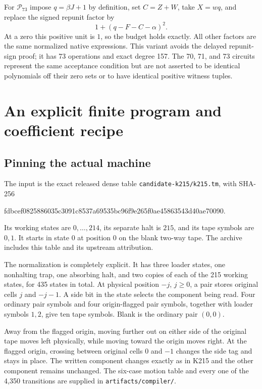 \documentclass[11pt]{article}
\theoremstyle{definition}
\newcommand{\norms}{\mathcal P}
\begin{document}
For $\norms_{73}$ impose $q=\beta J+1$ by definition, set $C=Z+W$,
take $X=wq$, and replace the signed repunit factor by
\[
 1+(q-F-C-\alpha)^2.
\]
At a zero this positive unit is $1$, so the budget holds exactly.
All other factors are the same normalized native expressions. This variant
avoids the delayed repunit-sign proof; it has 73 operations and exact
degree 157. The 70, 71, and 73 circuits represent the same acceptance
condition but are not asserted to be identical polynomials off their zero
sets or to have identical positive witness tuples.

\section{An explicit finite program and coefficient recipe}
\label{sec:coefficients}

\subsection{Pinning the actual machine}
\label{sec:controller}

The input is the exact released dense table
\texttt{candidate-k215/k215.tm}, with SHA-256
\begin{center}\small\ttfamily
 fdbcef0825886035c3091c8537a69535bc96f9e265f0ae45863543d40ae70090.
\end{center}
Its working states are $0,\ldots,214$, its separate halt is $215$, and its
tape symbols are $0,1$. It starts in state $0$ at position $0$ on the blank
two-way tape. The archive includes this table and its upstream attribution.

The normalization is completely explicit. It has three loader states,
one nonhalting trap, one absorbing halt, and two copies of each of the 215
working states, for 435 states in total. At physical position $-j$,
$j\geq0$, a pair stores original cells $j$ and $-j-1$. A side bit in the
state selects the component being read. Four ordinary pair symbols and four
origin-flagged pair symbols, together with loader symbols $1,2$, give ten
tape symbols. Blank is the ordinary pair $(0,0)$.

Away from the flagged origin, moving further out on either side of the
original tape moves left physically, while moving toward the origin moves
right. At the flagged origin, crossing between original cells $0$ and $-1$
changes the side tag and stays in place. The written component changes
exactly as in K215 and the other component remains unchanged. The six-case
motion table and every one of the 4,350 transitions are supplied in
\texttt{artifacts/compiler/}.
\end{document}
